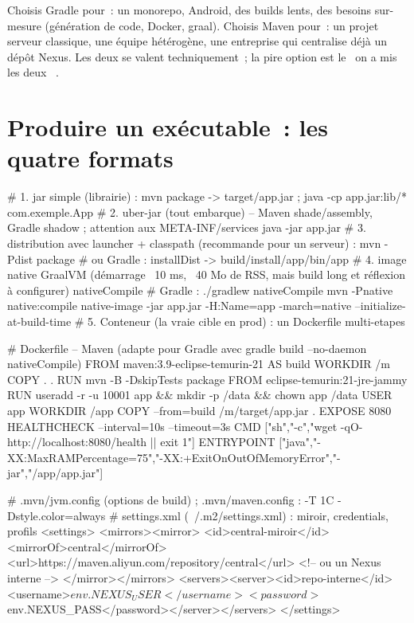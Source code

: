 \documentclass[12pt,a4paper,twoside,openright]{book}
\begin{document}
\begin{note}
Choisis Gradle pour~: un monorepo, Android, des builds lents, des besoins sur-mesure (g\'en\'eration de
code, Docker, graal). Choisis Maven pour~: un projet serveur classique, une \'equipe h\'et\'erog\`ene, une
entreprise qui centralise d\'ej\`a un d\'ep\^ot Nexus. Les deux se valent techniquement~; la pire option est
le \og ~on a mis les deux~ \fg{}.
\end{note}

\section{Produire un ex\'ecutable~: les quatre formats}

\begin{terminal}
# 1. jar simple (librairie) : mvn package -> target/app.jar ; java -cp app.jar:lib/* com.exemple.App
# 2. uber-jar (tout embarque) -- Maven shade/assembly, Gradle shadow ; attention aux META-INF/services
java -jar app.jar
# 3. distribution avec launcher + classpath (recommande pour un serveur) :
mvn -Pdist package         # ou Gradle : installDist -> build/install/app/bin/app
# 4. image native GraalVM (d\'emarrage ~10 ms, ~40 Mo de RSS, mais build long et r\'eflexion \`a configurer)
nativeCompile          # Gradle : ./gradlew nativeCompile
mvn -Pnative native:compile
native-image -jar app.jar -H:Name=app -march=native --initialize-at-build-time
# 5. Conteneur (la vraie cible en prod) : un Dockerfile multi-etapes
\end{terminal}

\begin{codeconf}
# Dockerfile -- Maven (adapte pour Gradle avec gradle build --no-daemon nativeCompile)
FROM maven:3.9-eclipse-temurin-21 AS build
WORKDIR /m
COPY . .
RUN mvn -B -DskipTests package
FROM eclipse-temurin:21-jre-jammy
RUN useradd -r -u 10001 app && mkdir -p /data && chown app /data
USER app
WORKDIR /app
COPY --from=build /m/target/app.jar .
EXPOSE 8080
HEALTHCHECK --interval=10s --timeout=3s CMD ["sh","-c","wget -qO- http://localhost:8080/health || exit 1"]
ENTRYPOINT ["java","-XX:MaxRAMPercentage=75","-XX:+ExitOnOutOfMemoryError","-jar","/app/app.jar"]
\end{codeconf}

\begin{codeconf}
# .mvn/jvm.config (options de build) ; .mvn/maven.config : -T 1C -Dstyle.color=always
# settings.xml (~/.m2/settings.xml) : miroir, credentials, profils
<settings>
  <mirrors><mirror>
    <id>central-miroir</id><mirrorOf>central</mirrorOf>
    <url>https://maven.aliyun.com/repository/central</url>   <!-- ou un Nexus interne -->
  </mirror></mirrors>
  <servers><server><id>repo-interne</id><username>${env.NEXUS_USER}</username>
           <password>${env.NEXUS_PASS}</password></server></servers>
</settings>
\end{codeconf}
\end{document}
